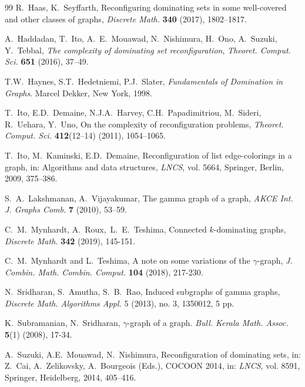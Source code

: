 \documentclass[12pt]{article}%
\begin{document}
\begin{thebibliography}{99}
R.~Haas, K.~Seyffarth, Reconfiguring dominating sets in some
well-covered and other classes of graphs, \emph{Discrete Math.} \textbf{340
}(2017), 1802--1817.

A.~Haddadan, T.~Ito, A.~E.~Mouawad, N.~Nishimura,
H.~Ono, A.~Suzuki, Y.~Tebbal, \emph{The complexity of dominating set
reconfiguration}, \emph{Theoret. Comput. Sci.} \textbf{651} (2016), 37--49.

T.W.~Haynes, S.T.~Hedetniemi, P.J.~Slater, \emph{Fundamentals of
Domination in Graphs}. Marcel Dekker, New York, 1998.

T.~Ito, E.D.~Demaine, N.J.A.~Harvey, C.H.~Papadimitriou,
M.~Sideri, R.~Uehara, Y.~Uno, On the complexity of reconfiguration problems,
\emph{Theoret. Comput. Sci.} \textbf{412}(12--14) (2011), 1054--1065.

T.~Ito, M.~Kaminski, E.D.~Demaine, Reconfiguration of list
edge-colorings in a graph, in: Algorithms and data structures,\emph{ LNCS},
vol. 5664, Springer, Berlin, 2009, 375--386.

S.~A.~Lakshmanan, A.~Vijayakumar, The gamma graph of a graph,
\emph{AKCE Int. J. Graphs Comb.} \textbf{7} (2010), 53--59.

C.~M.~Mynhardt, A.~Roux,\ L.~E.~Teshima, Connected
$k$-dominating graphs, \emph{Discrete Math. }\textbf{342} (2019), 145-151.

C.~M.~Mynhardt and L.~Teshima, A note on some variations of
the $\gamma$-graph, \emph{J. Combin. Math. Combin. Comput. }\textbf{104
}(2018), 217-230.

N.~Sridharan, S.~Amutha, S.~B.~Rao, Induced subgraphs of gamma
graphs, \emph{Discrete Math. Algorithms Appl.} 5 (2013), no. 3, 1350012, 5 pp.

K.~Subramanian, N.~Sridharan, $\gamma$-graph of a graph.
\emph{Bull. Kerala Math. Assoc.} \textbf{5}(1) (2008), 17-34.

A.~Suzuki, A.E.~Mouawad, N.~Nishimura, Reconfiguration of
dominating sets, in: Z.~Cai, A.~Zelikovsky, A.~Bourgeois (Eds.), COCOON 2014,
in: \emph{LNCS}, vol. 8591, Springer, Heidelberg, 2014, 405--416.
\end{thebibliography}

\bigskip
\end{document}
